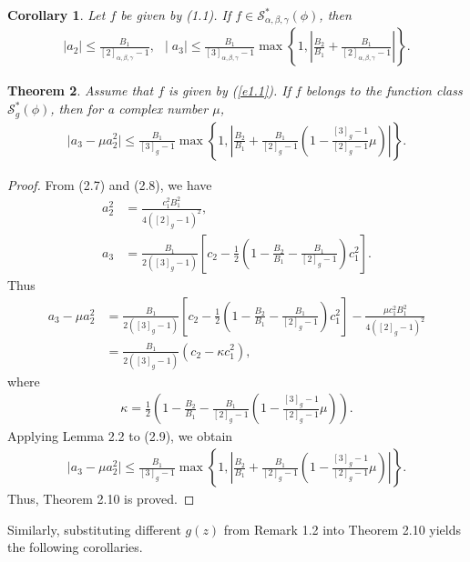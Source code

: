 \documentclass[11pt,twoside, reqno]{article}
\newtheorem{theorem}{Theorem}[section]
\newtheorem{corollary}[theorem]{Corollary}
\theoremstyle{definition}
\begin{document}
\begin{corollary}
Let $f$ be given by (1.1). If $f\in\mathcal{S}^{\ast }_{\alpha, \beta, \gamma}(\phi)$, then
\begin{align}
\mid a_{2}\mid \leq \frac{B_{1}}{[2]_{\alpha, \beta, \gamma}-1}\nonumber,\ \
\mid a_{3}\mid \leq\frac{B_{1}}{[3]_{\alpha, \beta, \gamma}-1}\max\left\{1, \left|\frac{B_{2}}{B_{1}}+\frac{B_{1}}{[2]_{\alpha, \beta, \gamma}-1}\right|\right\}.\nonumber
\end{align}
\end{corollary}

\begin{theorem}
Assume that $f$ is given by (\ref{e1.1}). If $f$ belongs to the function class $\mathcal{S}^{\ast }_{g}(\phi)$, then for a complex number $\mu$,
\begin{align}\nonumber
\mid a_3-\mu a_2^2\mid\leq \frac{B_{1}}{[3]_{g}-1}\max\left\{1,\left|\frac{B_{2}}{B_{1}}+
\frac{B_{1}}{[2]_{g}-1}\left(1-\frac{[3]_{g}-1}{[2]_{g}-1}\mu\right)\right|\right\}.
\end{align}
\end{theorem}

\begin{proof}
From (2.7) and (2.8), we have
\begin{align}\nonumber
a_{2}^{2} &= \frac{c_{1}^{2}B_{1}^{2}}{4([2]_{g}-1)^{2}}, \\\nonumber
a_{3} &= \frac{B_{1}}{2([3]_{g}-1)}\left[c_{2}-\frac{1}{2}\left(1-\frac{B_{2}}{B_{1}}-\frac{B_{1}}{[2]_{g}-1}\right)c_{1}^{2}\right].
\end{align}
Thus
\begin{align}\nonumber\label{e2.9}
a_{3}-\mu a_{2}^{2}&=\frac{B_{1}}{2([3]_{g}-1)}\left[c_{2}-\frac{1}{2}\left(1-\frac{B_{2}}{B_{1}}-\frac{B_{1}}{[2]_{g}-1}\right)c_{1}^{2}\right]-\frac{\mu c_{1}^{2}B_{1}^{2}}{4([2]_{g}-1)^{2}}\\
&=\frac{B_{1}}{2([3]_{g}-1)}(c_{2}-\kappa c_{1}^{2}),
\end{align}
where
\begin{align}\nonumber
\kappa=\frac{1}{2}\left(1-\frac{B_{2}}{B_{1}}-
\frac{B_{1}}{[2]_{g}-1}\left(1-\frac{[3]_{g}-1}{[2]_{g}-1}\mu\right)\right).
\end{align}
Applying Lemma 2.2 to (2.9), we obtain
\begin{align}\nonumber
\mid a_3-\mu a_2^2\mid\leq \frac{B_{1}}{[3]_{g}-1}\max\left\{1,\left|\frac{B_{2}}{B_{1}}+
\frac{B_{1}}{[2]_{g}-1}\left(1-\frac{[3]_{g}-1}{[2]_{g}-1}\mu\right)\right|\right\}.
\end{align}
Thus, Theorem 2.10 is proved.
\end{proof}
Similarly, substituting different $g(z)$ from Remark 1.2 into Theorem 2.10 yields the following corollaries.
\end{document}
